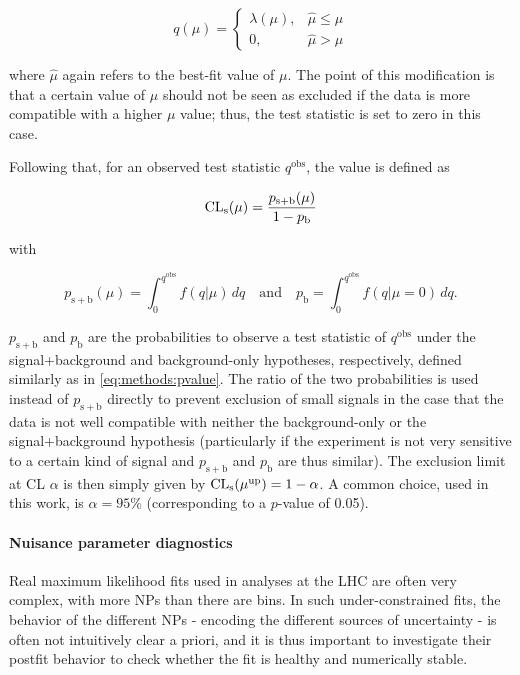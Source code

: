 \begin{equation}
    q(\mu) = \begin{cases} 
        \lambda(\mu), & \hat{\mu} \leq \mu \\
        0, & \hat{\mu} > \mu
    \end{cases}
\end{equation}

\noindent where $\hat{\mu}$ again refers to the best-fit value of $\mu$. The point of this modification is that a certain value of $\mu$ should not be seen as excluded if the data is more compatible with a higher $\mu$ value; thus, the test statistic is set to zero in this case.

Following that, for an observed test statistic $q^{\mathrm{obs}}$, the \CLs value is defined as

\begin{equation}
\label{eq:methods:cls}
    \mathrm{CL}_{\mathrm{s}} (\mu) = \frac { p_{\mathrm{s+b}} (\mu) } { 1 - p_{\mathrm{b}} }
\end{equation}

\noindent with

\begin{equation}
    p_{\mathrm{s+b}} (\mu) = \int_0^{q^{\mathrm{obs}}} f(q | \mu) \, dq
    \quad \text{and} \quad
    p_{\mathrm{b}} = \int_0^{q^{\mathrm{obs}}} f(q | \mu = 0) \, dq.
\end{equation}

$p_{\mathrm{s+b}}$ and $p_{\mathrm{b}}$ are the probabilities to observe a test statistic of $q^{\mathrm{obs}}$ under the signal+background and background-only hypotheses, respectively, defined similarly as in \cref{eq:methods:pvalue}. The ratio of the two probabilities is used instead of $p_{\mathrm{s+b}}$ directly to prevent exclusion of small signals in the case that the data is not well compatible with neither the background-only or the signal+background hypothesis (particularly if the experiment is not very sensitive to a certain kind of signal and $p_{\mathrm{s+b}}$ and $p_{\mathrm{b}}$ are thus similar). The exclusion limit at CL $\alpha$ is then simply given by $\mathrm{CL}_{\mathrm{s}} (\mu^{\mathrm{up}}) = 1 - \alpha$. A common choice, used in this work, is $\alpha = 95\%$ (corresponding to a $p$-value of 0.05).

\paragraph{Nuisance parameter diagnostics}

Real maximum likelihood fits used in analyses at the LHC are often very complex, with more NPs than there are bins. In such under-constrained fits, the behavior of the different NPs - encoding the different sources of uncertainty - is often not intuitively clear a priori, and it is thus important to investigate their postfit behavior to check whether the fit is healthy and numerically stable.

